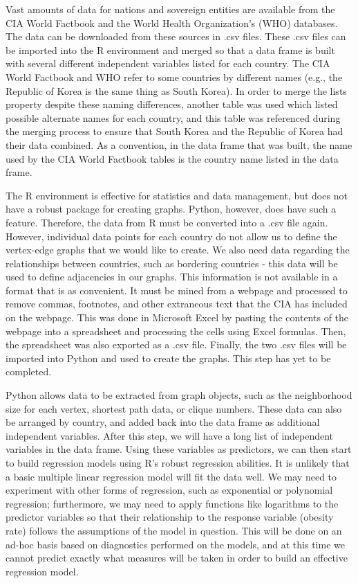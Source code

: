 \documentclass[oneside,12pt]{report}
\begin{document}
Vast amounts of data for nations and sovereign entities are available from the CIA World Factbook and the World Health Organization's (WHO) databases. The data can be downloaded from these sources in .csv files. These .csv files can be imported into the R environment and merged so that a data frame is built with several different independent variables listed for each country. The CIA World Factbook and WHO refer to some countries by different names (e.g., the Republic of Korea is the same thing as South Korea). In order to merge the lists property despite these naming differences, another table was used which listed possible alternate names for each country, and this table was referenced during the merging process to ensure that South Korea and the Republic of Korea had their data combined. As a convention, in the data frame that was built, the name used by the CIA World Factbook tables is the country name listed in the data frame.


The R environment is effective for statistics and data management, but does not have a robust package for creating graphs. Python, however, does have such a feature. Therefore, the data from R must be converted into a .csv file again. However, individual data points for each country do not allow us to define the vertex-edge graphs that we would like to create. We also need data regarding the relationships between countries, such as bordering countries - this data will be used to define adjacencies in our graphs. This information is not available in a format that is as convenient. It must be mined from a webpage and processed to remove commas, footnotes, and other extraneous text that the CIA has included on the webpage. This was done in Microsoft Excel by pasting the contents of the webpage into a spreadsheet and processing the cells using Excel formulas. Then, the spreadsheet was also exported as a .csv file. Finally, the two .csv files will be imported into Python and used to create the graphs. This step has yet to be completed.


Python allows data to be extracted from graph objects, such as the neighborhood size for each vertex, shortest path data, or clique numbers. These data can also be arranged by country, and added back into the data frame as additional independent variables. After this step, we will have a long list of independent variables in the data frame. Using these variables as predictors, we can then start to build regression models using R's robust regression abilities. It is unlikely that a basic multiple linear regression model will fit the data well. We may need to experiment with other forms of regression, such as exponential or polynomial regression; furthermore, we may need to apply functions like logarithms to the predictor variables so that their relationship to the response variable (obesity rate) follows the assumptions of the model in question. This will be done on an ad-hoc basis based on diagnostics performed on the models, and at this time we cannot predict exactly what measures will be taken in order to build an effective regression model.
\end{document}
